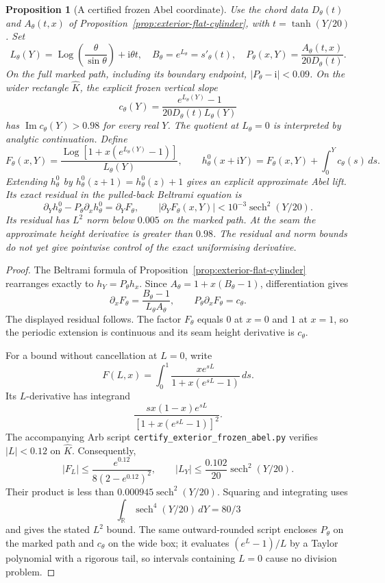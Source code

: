 \documentclass[11pt]{amsart}
\newtheorem{proposition}[theorem]{Proposition}
\theoremstyle{definition}
\newcommand{\ii}{\mathrm{i}}
\begin{document}
\begin{proposition}[A certified frozen Abel coordinate]
\label{prop:exterior-frozen-abel}
Use the chord data $D_\theta(t)$ and $A_\theta(t,x)$ of
Proposition~\ref{prop:exterior-flat-cylinder}, with
$t=\tanh(Y/20)$.  Set
\[
 L_\theta(Y)=
   \operatorname{Log}\!\left(\frac{\theta}{\sin\theta}\right)
       +\ii\theta t,\quad
 B_\theta=e^{L_\theta}=s'_\theta(t),\quad
 P_\theta(x,Y)=\frac{A_\theta(t,x)}{20D_\theta(t)}.
\]
On the full marked path, including its boundary endpoint,
$|P_\theta-\ii|<0.09$.  On the wider rectangle $\widehat K$,
the explicit frozen vertical slope
\[
 c_\theta(Y)=
 \frac{e^{L_\theta(Y)}-1}
      {20D_\theta(t)L_\theta(Y)}
\]
has $\operatorname{Im}c_\theta(Y)>0.98$ for every real $Y$.
The quotient at $L_\theta=0$ is interpreted by analytic
continuation.  Define
\[
 F_\theta(x,Y)=
 \frac{\operatorname{Log}
    [1+x(e^{L_\theta(Y)}-1)]}{L_\theta(Y)},\qquad
 h^0_\theta(x+\ii Y)=F_\theta(x,Y)+\int_0^Yc_\theta(s)\,ds.
\]
Extending $h^0_\theta$ by $h^0_\theta(z+1)=h^0_\theta(z)+1$
gives an explicit approximate Abel lift.  Its exact residual in
the pulled-back Beltrami equation is
\[
 \partial_Yh^0_\theta-P_\theta\partial_xh^0_\theta
       =\partial_YF_\theta,\qquad
 |\partial_YF_\theta(x,Y)|
       <10^{-3}\operatorname{sech}^2(Y/20).
\]
Its residual has $L^2$ norm below $0.005$ on the marked path.
At the seam the approximate height derivative is greater than
$0.98$.
The residual and norm bounds do not yet give pointwise control of
the exact uniformising derivative.
\end{proposition}

\begin{proof}
The Beltrami formula of
Proposition~\ref{prop:exterior-flat-cylinder} rearranges exactly to
$h_Y=P_\theta h_x$.  Since
$A_\theta=1+x(B_\theta-1)$, differentiation gives
\[
 \partial_xF_\theta=
 \frac{B_\theta-1}
      {L_\theta A_\theta},\qquad
 P_\theta\partial_xF_\theta=c_\theta.
\]
The displayed residual follows.  The factor $F_\theta$ equals
$0$ at $x=0$ and $1$ at $x=1$, so the periodic extension is
continuous and its seam height derivative is $c_\theta$.

For a bound without cancellation at $L=0$, write
\[
 F(L,x)=\int_0^1
    \frac{x e^{sL}}{1+x(e^{sL}-1)}\,ds.
\]
Its $L$-derivative has integrand
\[
 \frac{s x(1-x)e^{sL}}{[1+x(e^{sL}-1)]^2}.
\]
The accompanying Arb script
\texttt{certify\_exterior\_frozen\_abel.py} verifies
$|L|<0.12$ on $\widehat K$.  Consequently,
\[
 |F_L|\le
 \frac{e^{0.12}}{8(2-e^{0.12})^2},\qquad
 |L_Y|\le\frac{0.102}{20}\operatorname{sech}^2(Y/20).
\]
Their product is less than
$0.000945\operatorname{sech}^2(Y/20)$.
Squaring and integrating uses
\[
 \int_{\mathbb R}\operatorname{sech}^4(Y/20)\,dY=80/3
\]
and gives the stated $L^2$ bound.
The same outward-rounded script encloses
$P_\theta$ on the marked path and $c_\theta$ on the wide box;
it evaluates $(e^L-1)/L$ by a Taylor polynomial with a rigorous
tail, so intervals containing $L=0$ cause no division problem.
\end{proof}
\end{document}
